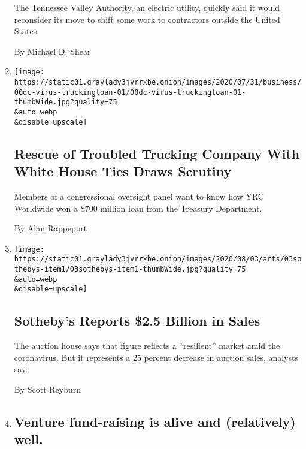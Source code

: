 \begin{enumerate}
  The Tennessee Valley Authority, an electric utility, quickly said it
  would reconsider its move to shift some work to contractors outside
  the United States.

  By Michael D. Shear
\item
  \href{/2020/08/03/us/politics/yrc-coronavirus-relief-funds.html}{}

  \texttt{[image: https://static01.graylady3jvrrxbe.onion/images/2020/07/31/business/00dc-virus-truckingloan-01/00dc-virus-truckingloan-01-thumbWide.jpg?quality=75\\\&auto=webp\\\&disable=upscale]}

  \hypertarget{rescue-of-troubled-trucking-company-with-white-house-ties-draws-scrutiny}{%
  \subsection{Rescue of Troubled Trucking Company With White House Ties
  Draws
  Scrutiny}\label{rescue-of-troubled-trucking-company-with-white-house-ties-draws-scrutiny}}

  Members of a congressional oversight panel want to know how YRC
  Worldwide won a \$700 million loan from the Treasury Department.

  By Alan Rappeport
\item
  \href{/2020/08/03/arts/design/sothebys-sales.html}{}

  \texttt{[image: https://static01.graylady3jvrrxbe.onion/images/2020/08/03/arts/03sothebys-item1/03sothebys-item1-thumbWide.jpg?quality=75\\\&auto=webp\\\&disable=upscale]}

  \hypertarget{sothebys-reports-25-billion-in-sales}{%
  \subsection{Sotheby's Reports \$2.5 Billion in
  Sales}\label{sothebys-reports-25-billion-in-sales}}

  The auction house says that figure reflects a ``resilient'' market
  amid the coronavirus. But it represents a 25 percent decrease in
  auction sales, analysts say.

  By Scott Reyburn
\item
  \href{/2020/08/03/business/venture-fund-raising-is-alive-and-relatively-well.html}{}

  \hypertarget{venture-fund-raising-is-alive-and-relatively-well}{%
  \subsection{Venture fund-raising is alive and (relatively)
  well.}\label{venture-fund-raising-is-alive-and-relatively-well}}


\end{enumerate}
